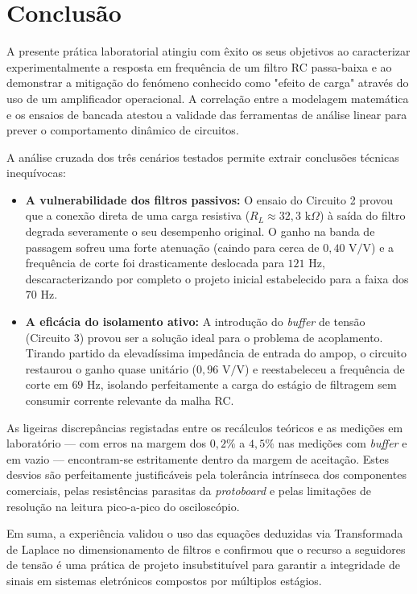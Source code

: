 \chapter{Conclusão}

A presente prática laboratorial atingiu com êxito os seus objetivos ao caracterizar experimentalmente a resposta em frequência de um filtro RC passa-baixa e ao demonstrar a mitigação do fenómeno conhecido como "efeito de carga" através do uso de um amplificador operacional. A correlação entre a modelagem matemática e os ensaios de bancada atestou a validade das ferramentas de análise linear para prever o comportamento dinâmico de circuitos.

A análise cruzada dos três cenários testados permite extrair conclusões técnicas inequívocas:
\begin{itemize}
	\item \textbf{A vulnerabilidade dos filtros passivos:} O ensaio do Circuito 2 provou que a conexão direta de uma carga resistiva ($R_L \approx 32,3\text{ k}\Omega$) à saída do filtro degrada severamente o seu desempenho original. O ganho na banda de passagem sofreu uma forte atenuação (caindo para cerca de $0,40\text{ V/V}$) e a frequência de corte foi drasticamente deslocada para $121\text{ Hz}$, descaracterizando por completo o projeto inicial estabelecido para a faixa dos $70\text{ Hz}$.
	\item \textbf{A eficácia do isolamento ativo:} A introdução do \textit{buffer} de tensão (Circuito 3) provou ser a solução ideal para o problema de acoplamento. Tirando partido da elevadíssima impedância de entrada do ampop, o circuito restaurou o ganho quase unitário ($0,96\text{ V/V}$) e reestabeleceu a frequência de corte em $69\text{ Hz}$, isolando perfeitamente a carga do estágio de filtragem sem consumir corrente relevante da malha RC.
\end{itemize}

As ligeiras discrepâncias registadas entre os recálculos teóricos e as medições em laboratório — com erros na margem dos $0,2\%$ a $4,5\%$ nas medições com \textit{buffer} e em vazio — encontram-se estritamente dentro da margem de aceitação. Estes desvios são perfeitamente justificáveis pela tolerância intrínseca dos componentes comerciais, pelas resistências parasitas da \textit{protoboard} e pelas limitações de resolução na leitura pico-a-pico do osciloscópio.

Em suma, a experiência validou o uso das equações deduzidas via Transformada de Laplace no dimensionamento de filtros e confirmou que o recurso a seguidores de tensão é uma prática de projeto insubstituível para garantir a integridade de sinais em sistemas eletrónicos compostos por múltiplos estágios.